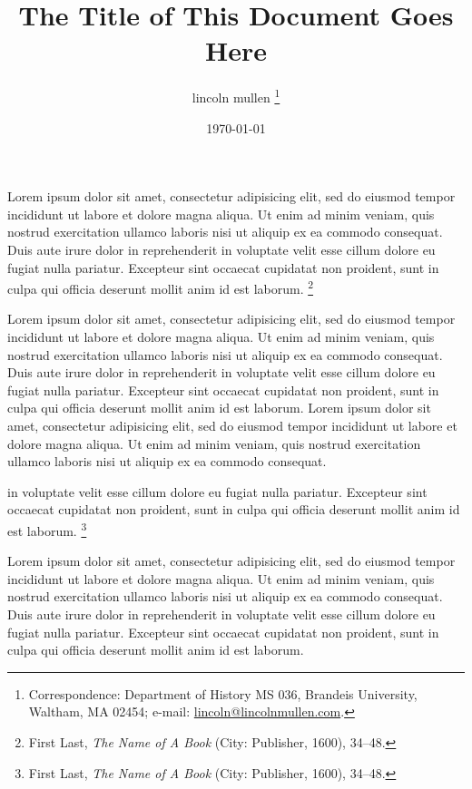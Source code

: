 \documentclass[11pt]{academic-article}
\title{%
	The Title of This Document Goes Here%
	}
\author{\MakeLowercase{%
	Lincoln Mullen%
		}\thanks{%
	Correspondence: Department of History MS 036, Brandeis University, Waltham, MA 02454; e-mail: \href{mailto:lincoln@lincolnmullen.com}{lincoln@lincolnmullen.com}.%
	}}
\date{\MakeLowercase{%
	\today%
	}}
\begin{document}
\maketitle

Lorem ipsum dolor sit amet, consectetur adipisicing elit, sed do eiusmod tempor incididunt ut labore et dolore magna aliqua. Ut enim ad minim veniam, quis nostrud exercitation ullamco laboris nisi ut aliquip ex ea commodo consequat. Duis aute irure dolor in reprehenderit in voluptate velit esse cillum dolore eu fugiat nulla pariatur. Excepteur sint occaecat cupidatat non proident, sunt in culpa qui officia deserunt mollit anim id est laborum.%
	\footnote{First Last, \emph{The Name of A Book} (City: Publisher, 1600), 34--48.}

Lorem ipsum dolor sit amet, consectetur adipisicing elit, sed do eiusmod tempor incididunt ut labore et dolore magna aliqua. Ut enim ad minim veniam, quis nostrud exercitation ullamco laboris nisi ut aliquip ex ea commodo consequat. Duis aute irure dolor in reprehenderit in voluptate velit esse cillum dolore eu fugiat nulla pariatur. Excepteur sint occaecat cupidatat non proident, sunt in culpa qui officia deserunt mollit anim id est laborum. Lorem ipsum dolor sit amet, consectetur adipisicing elit, sed do eiusmod tempor incididunt ut labore et dolore magna aliqua. Ut enim ad minim veniam, quis nostrud exercitation ullamco laboris nisi ut aliquip ex ea commodo consequat. 

 in voluptate velit esse cillum dolore eu fugiat nulla pariatur. Excepteur sint occaecat cupidatat non proident, sunt in culpa qui officia deserunt mollit anim id est laborum.%
	\footnote{First Last, \emph{The Name of A Book} (City: Publisher, 1600), 34--48.}

Lorem ipsum dolor sit amet, consectetur adipisicing elit, sed do eiusmod tempor incididunt ut labore et dolore magna aliqua. Ut enim ad minim veniam, quis nostrud exercitation ullamco laboris nisi ut aliquip ex ea commodo consequat. Duis aute irure dolor in reprehenderit in voluptate velit esse cillum dolore eu fugiat nulla pariatur. Excepteur sint occaecat cupidatat non proident, sunt in culpa qui officia deserunt mollit anim id est laborum.
\end{document}
